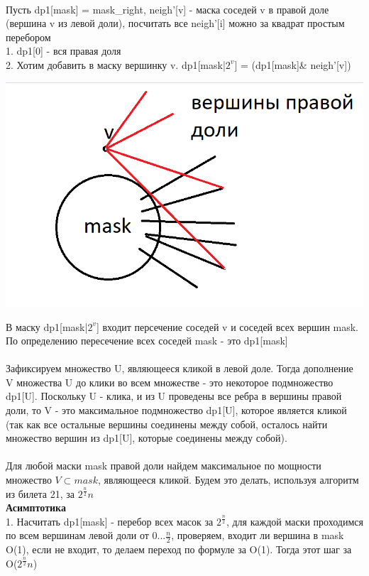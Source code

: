 \\ 
Пусть dp1[mask] = mask\_right, neigh'[v] - маска соседей v в правой доле (вершина v из левой доли), посчитать все neigh'[i] можно за квадрат простым перебором\\
1. dp1[0] - вся правая доля\\
2. Хотим добавить в маску вершинку v. dp1[mask|$2^v$] = (dp1[mask]\& neigh'[v])
\begin{center}
    \includegraphics[width=17cm]{images/18-24_alg3.PNG}
\end{center}
В маску dp1[mask|$2^v$] входит персечение соседей v и соседей всех вершин mask. По определению пересечение всех соседей mask - это dp1[mask]
\\
\\ Зафиксируем множество U, являющееся кликой в левой доле. Тогда дополнение V множества U до клики во всем множестве - это некоторое подмножество dp1[U]. Поскольку U - клика, и из U проведены все ребра в вершины правой доли, то V - это максимальное подмножество dp1[U], которое является кликой (так как все остальные вершины соединены между собой, осталось найти множество вершин из dp1[U], которые соединены между собой). 
\\
\\ Для любой маски mask правой доли найдем максимальное по мощности множество $V \subset mask$, являющееся кликой. Будем это делать, используя алгоритм из билета 21, за $2^{\frac{n}{2}} n$\\
\textbf{Асимптотика}\\
1. Насчитать dp1[mask] - перебор всех масок за $2^{\frac{n}{2}}$, для каждой маски проходимся по всем вершинам левой доли от 0...$\frac{n}{2}$, проверяем, входит ли вершина в mask O(1), если не входит, то делаем переход по формуле за O(1). Тогда этот шаг за O($2^{\frac{n}{2}}n$)\\  

